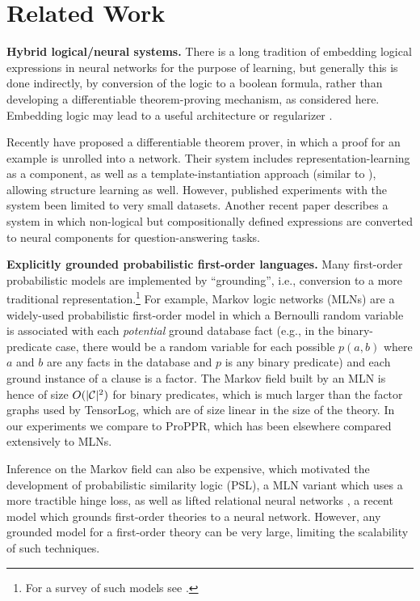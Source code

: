\documentclass{article}
\newcommand{\mysubsection}[1]{\textbf{{#1}.}}
\newcommand{\C}{{\cal{C}}}
\begin{document}
\section{Related Work}

\mysubsection{Hybrid logical/neural systems} There is a long tradition
of embedding logical expressions in neural networks for the purpose of
learning, but generally this is done indirectly, by conversion of the
logic to a boolean formula, rather than developing a differentiable
theorem-proving mechanism, as considered here.  Embedding logic may
lead to a useful architecture \cite{TowellAAAI90} or regularizer
\cite{riedelinjecting2015}.

Recently \cite{rocktaschel2016learning} have proposed a differentiable
theorem prover, in which a proof for an example is unrolled into a
network.  Their system includes representation-learning as a
component, as well as a template-instantiation approach (similar to
\cite{wang2014structure}), allowing structure learning as well.
However, published experiments with the system been limited to very
small datasets.  Another recent paper
\cite{DBLP:journals/corr/AndreasRDK16} describes a system in which
non-logical but compositionally defined expressions are converted to
neural components for question-answering tasks.

\mysubsection{Explicitly grounded probabilistic first-order languages}
Many first-order probabilistic models are implemented by
``grounding'', i.e., conversion to a more traditional
representation.\footnote{For a survey of such models see
  \cite{kimmig2015lifted}.}  For example, Markov logic networks (MLNs)
are a widely-used probabilistic first-order model
\cite{RichardsonMLJ2006} in which a Bernoulli random variable is
associated with each \emph{potential} ground database fact (e.g., in
the binary-predicate case, there would be a random variable for each
possible $p(a,b)$ where $a$ and $b$ are any facts in the database and
$p$ is any binary predicate) and each ground instance of a clause is a
factor.  The Markov field built by an MLN is hence of size $O(|\C|^2)$
for binary predicates, which is much larger than the factor graphs
used by TensorLog, which are of size linear in the size of the theory.
In our experiments we compare to ProPPR, which has been elsewhere
compared extensively to MLNs.

Inference on the Markov field can also be expensive, which motivated
the development of probabilistic similarity logic (PSL),
\cite{brocheler2012probabilistic} a MLN variant which uses a more
tractible hinge loss, as well as lifted relational neural networks
\cite{DBLP:journals/corr/SourekAZK15}, a recent model which grounds
first-order theories to a neural network.  However, any grounded model
for a first-order theory can be very large, limiting the scalability
of such techniques.
\end{document}
